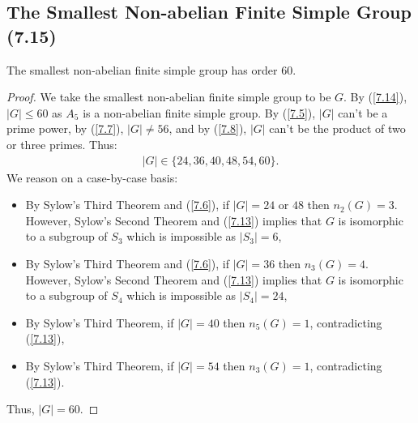 \subsection{The Smallest Non-abelian Finite Simple Group (7.15)} \label{7.15}

The smallest non-abelian finite simple group has order 60.

\begin{proof}
    We take the smallest non-abelian finite simple group to be $G$.
    By (\ref{7.14}), $|G| \leq 60$ as $A_5$ is a non-abelian finite
    simple group.
    By (\ref{7.5}), $|G|$ can't be a prime power, by (\ref{7.7}),
    $|G| \neq 56$, and by (\ref{7.8}), $|G|$ can't be the product
    of two or three primes. Thus: \begin{align*}
        |G| \in \{24, 36, 40, 48, 54, 60\}.
    \end{align*} We reason on a case-by-case basis: \begin{itemize}
        \item By Sylow's Third Theorem and (\ref{7.6}),
            if $|G| = 24$ or $48$ then $n_2(G) = 3$. However,
            Sylow's Second Theorem and (\ref{7.13}) implies that
            $G$ is isomorphic to a subgroup of $S_3$ which is
            impossible as $|S_3| = 6$,
        \item By Sylow's Third Theorem and (\ref{7.6}),
            if $|G| = 36$ then $n_3(G) = 4$. However,
            Sylow's Second Theorem and (\ref{7.13}) implies that
            $G$ is isomorphic to a subgroup of $S_4$ which is
            impossible as $|S_4| = 24$,
        \item By Sylow's Third Theorem, if $|G| = 40$ then 
            $n_5(G) = 1$, contradicting (\ref{7.13}),
        \item By Sylow's Third Theorem, if $|G| = 54$ then 
            $n_3(G) = 1$, contradicting (\ref{7.13}).
    \end{itemize} Thus, $|G| = 60$.
\end{proof}
